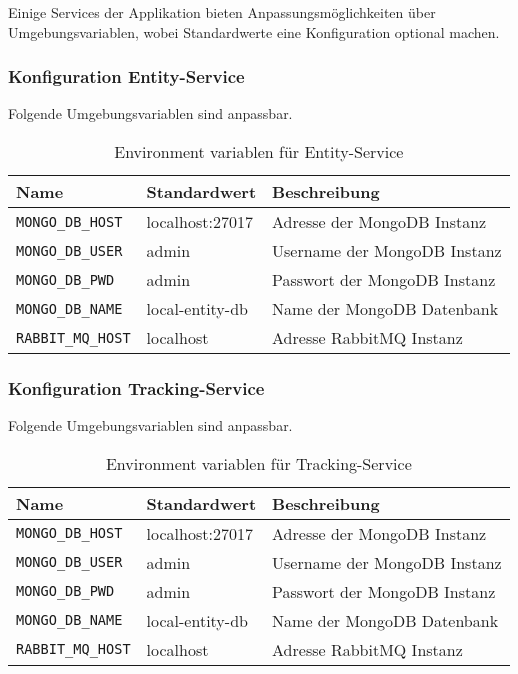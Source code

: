 Einige Services der Applikation bieten Anpassungsmöglichkeiten über Umgebungsvariablen, wobei Standardwerte eine Konfiguration optional machen.

\subsubsection{Konfiguration Entity-Service}

Folgende Umgebungsvariablen sind anpassbar.


\begin{table}[h]
	\begin{tabular}{|l|l|l|}
		\hline
		Name & Standardwert & Beschreibung \\ \hline
		\verb|MONGO_DB_HOST| & localhost:27017 & Adresse der MongoDB Instanz \\ \hline
		\verb|MONGO_DB_USER| & admin & Username der MongoDB Instanz \\ \hline
		\verb|MONGO_DB_PWD| & admin & Passwort der MongoDB Instanz \\ \hline
		\verb|MONGO_DB_NAME| & local-entity-db & Name der MongoDB Datenbank \\ \hline
		\verb|RABBIT_MQ_HOST| & localhost & Adresse RabbitMQ Instanz \\ \hline
	\end{tabular}
	\caption{Environment variablen für Entity-Service }
\end{table}

\subsubsection{Konfiguration Tracking-Service}

Folgende Umgebungsvariablen sind anpassbar.


\begin{table}[h]
	\begin{tabular}{|l|l|l|}
		\hline
		Name & Standardwert & Beschreibung \\ \hline
		\verb|MONGO_DB_HOST| & localhost:27017 & Adresse der MongoDB Instanz \\ \hline
		\verb|MONGO_DB_USER| & admin & Username der MongoDB Instanz \\ \hline
		\verb|MONGO_DB_PWD| & admin & Passwort der MongoDB Instanz \\ \hline
		\verb|MONGO_DB_NAME| & local-entity-db & Name der MongoDB Datenbank \\ \hline
		\verb|RABBIT_MQ_HOST| & localhost & Adresse RabbitMQ Instanz \\ \hline
	\end{tabular}
	\caption{Environment variablen für Tracking-Service }
\end{table}

